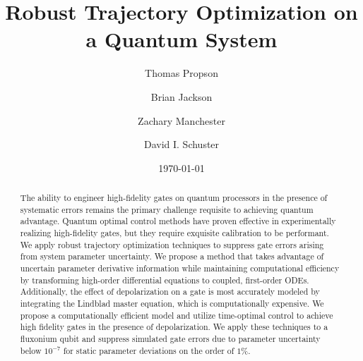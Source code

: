 \title{Robust Trajectory Optimization on a Quantum System}

\author{Thomas Propson}
\author{Brian Jackson}
\author{Zachary Manchester}
\author{David I. Schuster}

\date{\today}

\begin{abstract}
  The ability to engineer high-fidelity gates on quantum processors in the presence of
  systematic errors remains the primary challenge requisite to achieving quantum advantage.
  Quantum optimal control methods have proven effective in experimentally
  realizing high-fidelity gates, but they require exquisite calibration to be performant.
  We apply robust trajectory optimization techniques to suppress gate errors arising from system
  parameter uncertainty.
  We propose a method that takes advantage of uncertain parameter
  derivative information while maintaining
  computational efficiency by transforming high-order differential equations to coupled,
  first-order ODEs.
  Additionally, the effect of depolarization on a gate is most accurately modeled by
  integrating the Lindblad master equation,
  which is computationally expensive.
  We propose a computationally efficient model
  and utilize time-optimal control to achieve high fidelity gates in the presence of depolarization.
  We apply these techniques to a fluxonium qubit and suppress
  simulated gate errors due to parameter uncertainty below $10^{-7}$ for
  static parameter deviations on the order of $1\%$.
\end{abstract}

\maketitle
